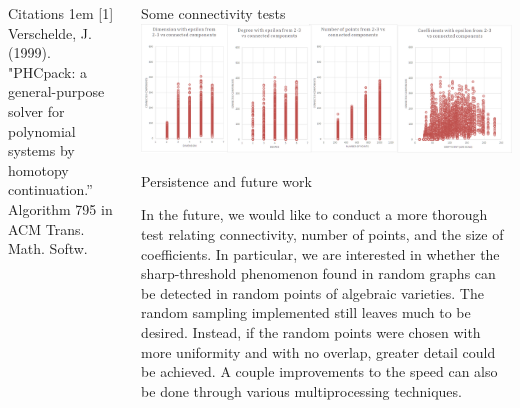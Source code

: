 \documentclass{beamer}
\begin{document}
\begin{frame}{}
\begin{columns}[t]
\begin{column}{0.32\linewidth}
\begin{block}{Citations}
\hangindent1em
[1] Verschelde, J. (1999). "PHCpack: a general-purpose solver for polynomial systems by homotopy continuation.'' Algorithm 795 in  ACM Trans. Math. Softw. 

\end{block}
\end{column}%

\begin{column}{0.32\linewidth}

\begin{block}{Some connectivity tests}
\includegraphics[width=1\columnwidth]{2-3_plots}
\end{block}



\begin{block}{Persistence and future work}

In the future, we would like to conduct a more thorough test relating
connectivity, number of points, and the size of coefficients. In particular, we
are interested in whether the sharp-threshold phenomenon found in random graphs
can be detected in random points of algebraic varieties. The random sampling implemented still leaves much to be desired. Instead, if the random points were chosen with more uniformity and with no overlap, greater detail could be achieved. A couple improvements to the speed can also be done through various multiprocessing techniques. 
\end{block}


\end{column}
\end{columns}
\end{frame}
\end{document}
